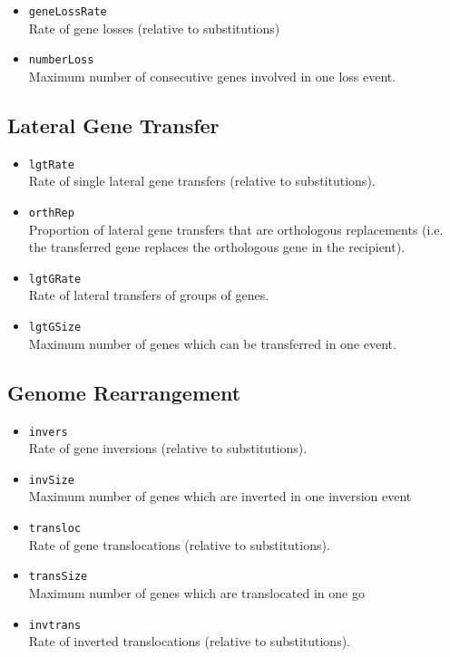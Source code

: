 \documentclass[11pt]{article}
\begin{document}
\begin{itemize}
\item{\texttt{geneLossRate}} \hfill \\
Rate of gene losses (relative to substitutions)
\item{\texttt{numberLoss}} \hfill \\
Maximum number of consecutive genes involved in one loss event.
\end{itemize}

\subsection{Lateral Gene Transfer}
\begin{itemize}
\item{\texttt{lgtRate}} \hfill \\
Rate of single lateral gene transfers (relative to substitutions).
\item{\texttt{orthRep}} \hfill \\
Proportion of lateral gene transfers that are orthologous replacements (i.e. the transferred gene replaces the orthologous gene in the recipient).
\item{\texttt{lgtGRate}} \hfill \\
Rate of lateral transfers of groups of genes.
\item{\texttt{lgtGSize}} \hfill \\
Maximum number of genes which can be transferred in one event.
\end{itemize}

\subsection{Genome Rearrangement}  
\begin{itemize}
\item{\texttt{invers}} \hfill \\
Rate of gene inversions (relative to substitutions).
\item{\texttt{invSize}} \hfill \\
Maximum number of genes which are inverted in one inversion event
\item{\texttt{transloc}} \hfill \\
Rate of gene translocations (relative to substitutions).
\item{\texttt{transSize}} \hfill \\
Maximum number of genes which are translocated in one go
\item{\texttt{invtrans}} \hfill \\
Rate of inverted translocations (relative to substitutions).
\end{itemize}
\end{document}
